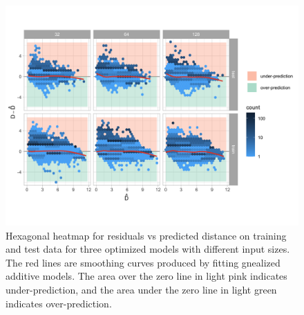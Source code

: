 \documentclass[]{interact}
\theoremstyle{plain}%
\theoremstyle{definition}
\theoremstyle{remark}
\begin{document}
\begin{figure}[!h]

{\centering \includegraphics[width=1\linewidth]{paper_files/figure-latex/model-performance-1} 

}

\caption{Hexagonal heatmap for residuals vs predicted distance on training and test data for three optimized models with different input sizes. The red lines are smoothing curves produced by fitting gnealized additive models. The area over the zero line in light pink indicates under-prediction, and the area under the zero line in light green indicates over-prediction.}\label{fig:model-performance}
\end{figure}

\begin{table}

\caption{\label{tab:performance-sub}The training and test performance of the $32 \times 32$ model presented with different model violations.}
\centering
{}
\end{table}
\end{document}
